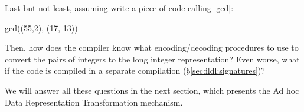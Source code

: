 Last but not least, assuming write a piece of code calling |gcd|:

\begin{lstlisting-nobreak}
gcd((55,2), (17, 13))
\end{lstlisting-nobreak}

Then, how does the compiler know what encoding/decoding procedures to use to convert the pairs of integers to the long integer representation? Even worse, what if the code is compiled in a separate compilation (\S\ref{sec:ildl:signatures})?

We will answer all these questions in the next section, which presents the Ad hoc Data Representation Transformation mechanism.
